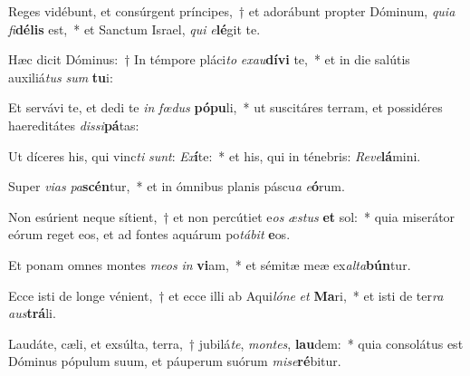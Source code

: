 \item Reges vidébunt, et consúrgent príncipes,~† et adorábunt propter Dóminum, \textit{qui}\textit{a} \textit{fi}\textbf{dé}\textbf{lis} est,~* et Sanctum Israel, \textit{qui} \textit{e}\textbf{lé}git te.
\item Hæc dicit Dóminus:~† In témpore pláci\textit{to} \textit{ex}\textit{au}\textbf{dí}\textbf{vi} te,~* et in die salútis auxiliá\textit{tus} \textit{sum} \textbf{tu}i:
\item Et servávi te, et dedi te \textit{in} \textit{fœ}\textit{dus} \textbf{pó}\textbf{pu}li,~* ut suscitáres terram, et possidéres haereditátes \textit{dis}\textit{si}\textbf{pá}tas:
\item Ut díceres his, qui vinc\textit{ti} \textit{sunt}: \textit{Ex}\textbf{í}te:~* et his, qui in ténebris: \textit{Re}\textit{ve}\textbf{lá}mini.
\item Super \textit{vi}\textit{as} \textit{pa}\textbf{scén}tur,~* et in ómnibus planis páscu\textit{a} \textit{e}\textbf{ó}rum.
\item Non esúrient neque sítient,~† et non percútiet e\textit{os} \textit{æs}\textit{tus} \textbf{et} sol:~* quia miserátor eórum reget eos, et ad fontes aquárum po\textit{tá}\textit{bit} \textbf{e}os.
\item Et ponam omnes montes \textit{me}\textit{os} \textit{in} \textbf{vi}am,~* et sémitæ meæ ex\textit{al}\textit{ta}\textbf{bún}tur.
\item Ecce isti de longe vénient,~† et ecce illi ab Aqui\textit{ló}\textit{ne} \textit{et} \textbf{Ma}ri,~* et isti de ter\textit{ra} \textit{aus}\textbf{trá}li.
\item Laudáte, cæli, et exsúlta, terra,~† jubilá\textit{te}, \textit{mon}\textit{tes}, \textbf{lau}dem:~* quia consolátus est Dóminus pópulum suum, et páuperum suórum \textit{mi}\textit{se}\textbf{ré}bitur.
